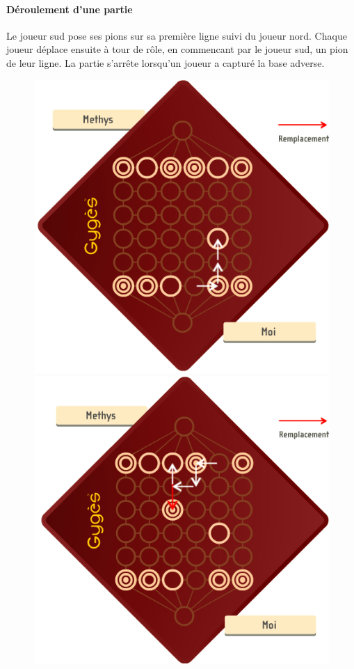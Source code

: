\documentclass[a4paper]{article}
\begin{document}
		\paragraph{Déroulement d'une partie} Le joueur sud pose ses pions sur sa première ligne
		suivi du joueur nord. Chaque joueur déplace ensuite à tour de rôle, en commencant par le
		joueur sud, un pion de leur ligne. La partie s'arrête lorsqu'un joueur a capturé la base
		adverse.

		\begin{figure}[ht]
			\centering
			\begin{minipage}[b]{0.4\linewidth}
			\centering
			\includegraphics[width=\textwidth]{ex1.png}
			\end{minipage}
			\hspace{0.5cm}
			\begin{minipage}[b]{0.4\linewidth}
			\centering
			\includegraphics[width=\textwidth]{ex2.png}

\end{minipage}
\end{figure}
\end{document}
